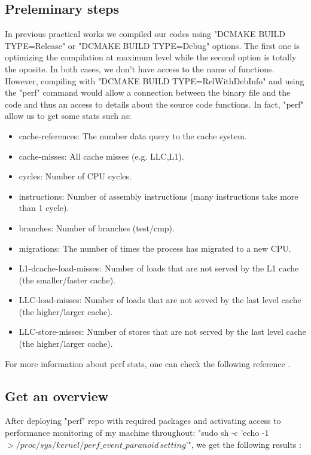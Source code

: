 \documentclass[a4paper, 10 pt, conference]{ieeeconf}
\begin{document}
\subsection{Preleminary steps}
In previous practical works we compiled our codes using "DCMAKE BUILD TYPE=Release" or "DCMAKE BUILD TYPE=Debug" options. The first one is optimizing the compilation at maximum level while the second option is totally the oposite. In both cases, we don't have access to the name of functions. However, compiling with "DCMAKE BUILD TYPE=RelWithDebInfo" and using the "perf" command would allow a connection between the binary file and the code and thus an access to details about the source code functions. In fact, "perf" allow us to get some stats such as:
\begin{itemize}
\item cache-references: The number data query to the cache system.
\item cache-misses: All cache misses (e.g. LLC,L1).
\item cycles: Number of CPU cycles.
\item instructions: Number of assembly instructions (many instructions take more than 1 cycle).
\item branches: Number of branches (test/cmp).
\item migrations: The number of times the process has migrated to a new CPU.
\item L1-dcache-load-misses: Number of loads that are not served by the L1 cache (the smaller/faster cache).
\item LLC-load-misses: Number of loads that are not served by the last level cache (the higher/larger cache).
\item LLC-store-misses: Number of stores that are not served by the last level cache (the higher/larger cache).

\end{itemize}

For more information about perf stats, one can check the following reference \cite{1}.
\subsection{Get an overview}

After deploying "perf" repo with required packages and activating access to performance monitoring of my machine throughout: "sudo sh -c 'echo -1 $>/proc/sys/kernel/perf \_ event \_ paranoid \, setting$'", we get the
following results :
\end{document}
